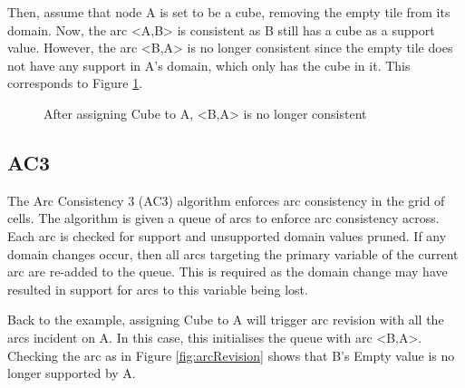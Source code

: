 Then, assume that node A is set to be a cube, removing the empty tile from its domain. Now, the arc <A,B> is consistent as B still has a cube as a support value. However, the arc <B,A> is no longer consistent since the empty tile does not have any support in A's domain, which only has the cube in it. This corresponds to Figure \ref{fig:arcsAssigned}.

\begin{figure}[H]
    \centering
    \caption{After assigning Cube to A, <B,A> is no longer consistent}
    \label{fig:arcsAssigned}
\end{figure}

\subsection{AC3}
The Arc Consistency 3 (AC3) algorithm enforces arc consistency in the grid of cells. The algorithm is given a queue of arcs to enforce arc consistency across. Each arc is checked for support and unsupported domain values pruned. If any domain changes occur, then all arcs targeting the primary variable of the current arc are re-added to the queue. This is required as the domain change may have resulted in support for arcs to this variable being lost.

Back to the example, assigning Cube to A will trigger arc revision with all the arcs incident on A. In this case, this initialises the queue with arc <B,A>. Checking the arc as in Figure \ref{fig:arcRevision} shows that B's Empty value is no longer supported by A.

